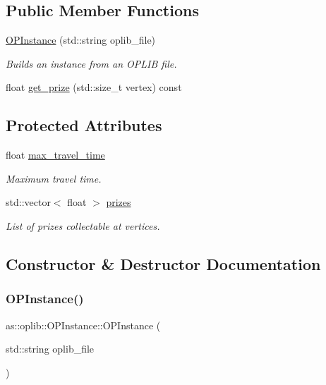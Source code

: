 \subsection*{Public Member Functions}
\begin{DoxyCompactItemize}
\item 
\hyperlink{classas_1_1oplib_1_1OPInstance_a6324297e7797771f734a0e373dc6d218}{O\+P\+Instance} (std\+::string oplib\+\_\+file)
\begin{DoxyCompactList}\small\item\em Builds an instance from an O\+P\+L\+IB file. \end{DoxyCompactList}\item 
float \hyperlink{classas_1_1oplib_1_1OPInstance_a7e641c06d51b916cdf6ae88a4510ee0b}{get\+\_\+prize} (std\+::size\+\_\+t vertex) const
\end{DoxyCompactItemize}
\subsection*{Protected Attributes}
\begin{DoxyCompactItemize}
\item 
float \hyperlink{classas_1_1oplib_1_1OPInstance_a57be40043f2881e6ba41d62ad6bd223c}{max\+\_\+travel\+\_\+time}
\begin{DoxyCompactList}\small\item\em Maximum travel time. \end{DoxyCompactList}\item 
std\+::vector$<$ float $>$ \hyperlink{classas_1_1oplib_1_1OPInstance_ae04b2b823f630159c31d7c3f2f3fcdb5}{prizes}
\begin{DoxyCompactList}\small\item\em List of prizes collectable at vertices. \end{DoxyCompactList}\end{DoxyCompactItemize}


\subsection{Constructor \& Destructor Documentation}
\mbox{\label{classas_1_1oplib_1_1OPInstance_a6324297e7797771f734a0e373dc6d218}} 
\subsubsection{\texorpdfstring{O\+P\+Instance()}{OPInstance()}}
{\footnotesize\ttfamily as\+::oplib\+::\+O\+P\+Instance\+::\+O\+P\+Instance (\begin{DoxyParamCaption}\item[{std\+::string}]{oplib\+\_\+file }\end{DoxyParamCaption})\hspace{0.3cm}{\ttfamily [inline]}}



